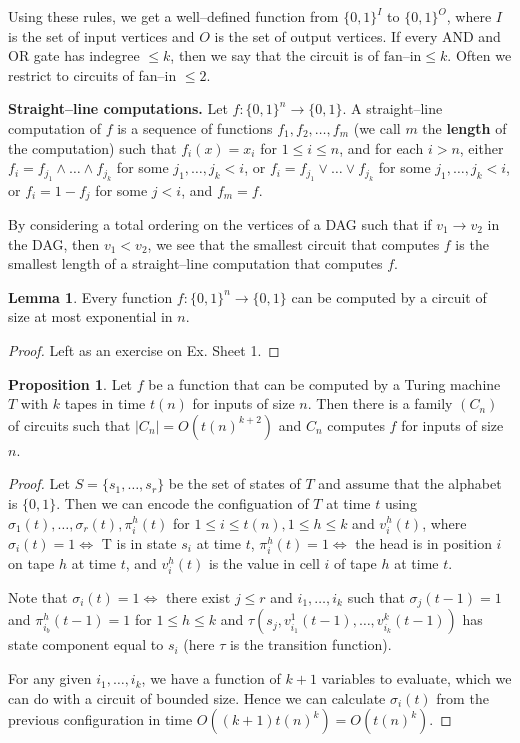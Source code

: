 \documentclass{article}
\theoremstyle{definition}
\newtheorem{lemma}[theorem]{Lemma}
\newtheorem{prop}[theorem]{Proposition}
\begin{document}
Using these rules, we get a well--defined function from $\{0,1\}^{I}$ to $\{0,1\}^{O}$, where $I$ is the set of input vertices and $O$ is the set of output vertices. If every AND and OR gate has indegree $\le k$, then we say that the circuit is of $\text{fan--in} \le k$. Often we restrict to circuits of fan--in $\le 2$.
\vspace{1mm}
 
\textbf{Straight--line computations.} Let $f : \{0,1\}^n \to \{0,1\}$. A straight--line computation of $f$ is a sequence of functions $f_1,f_2,\ldots,f_m$ (we call $m$ the \textbf{length} of the computation) such that $f_i(x) = x_i$ for $1\le i\le n$, and for each $i>n$, either $f_i = f_{j_1} \wedge \ldots \wedge f_{j_k}$ for some $j_1,\ldots,j_k < i$, or $f_i = f_{j_1} \vee \ldots \vee f_{j_k}$ for some $j_1,\ldots,j_k < i$, or $f_i = 1 - f_j$ for some $j<i$, and $f_m = f$.
\vspace{1mm}
 
By considering a total ordering on the vertices of a DAG such that if $v_1 \to v_2$ in the DAG, then $v_1 < v_2$, we see that the smallest circuit that computes $f$ is the smallest length of a straight--line computation that computes $f$.

\begin{lemma}
    Every function $f : \{0,1\}^n \to \{0,1\}$ can be computed by a circuit of size at most exponential in $n$.
\end{lemma}
\begin{proof}
    Left as an exercise on Ex. Sheet 1. 
\end{proof}
\begin{prop}
    Let $f$ be a function that can be computed by a Turing machine $T$ with $k$ tapes in time $t(n)$ for inputs of size $n$. Then there is a family $(C_n)$ of circuits such that $|C_n| = O(t(n)^{k+2})$ and $C_n$ computes $f$ for inputs of size $n$. 
\end{prop}
\begin{proof}
    Let $S = \{s_1,\ldots,s_r\}$ be the set of states of $T$ and assume that the alphabet is $\{0,1\}$. Then we can encode the configuation of $T$ at time $t$ using $\sigma_1(t),\ldots,\sigma_r(t), \pi_{i}^h(t)$ for $1\le i\le t(n),1\le h\le k$ and $v_i^h(t)$, where $\sigma_i(t) = 1 \iff$ T is in state $s_i$ at time $t$, $\pi_i^h(t) = 1 \iff$ the head is in position $i$ on tape $h$ at time $t$, and $v_i^h(t)$ is the value in cell $i$ of tape $h$ at time $t$.
    \vspace{1mm}
     
    Note that $\sigma_i(t) = 1 \iff$ there exist $j\le r$ and $i_1,\ldots,i_k$ such that $\sigma_j(t-1)=1$ and $\pi_{i_b}^h(t-1) = 1$ for $1\le h\le k$ and $\tau(s_j, v_{i_1}^1(t-1), \ldots, v_{i_k}^k(t-1))$ has state component equal to $s_i$ (here $\tau$ is the transition function).  
    \vspace{1mm}
     
    For any given $i_1,\ldots,i_k$, we have a function of $k+1$ variables to evaluate, which we can do with a circuit of bounded size. Hence we can calculate $\sigma_i(t)$ from the previous configuration in time $O((k+1)t(n)^k) = O(t(n)^k)$.
\end{proof}
\end{document}
